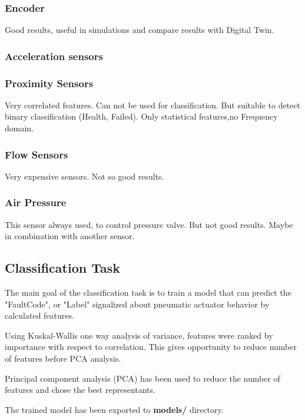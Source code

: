 \documentclass[class=article, crop=false]{standalone}
\begin{document}
\subsubsection{Encoder}
Good results, useful in simulations and compare results with Digital Twin.

\subsubsection{Acceleration sensors}

\subsubsection{Proximity Sensors}
Very correlated features. Can not be used for classification. But suitable
to detect binary classification (Health, Failed).
Only statistical features,no Frequency domain.

\subsubsection{Flow Sensors}
Very expensive sensors. Not so good results.

\subsubsection{Air Pressure}
This sensor always used, to control pressure valve. But not good results.
Maybe in combination with another sensor.

\subsection{Classification Task}

The main goal of the classification task is to train a model that can
predict the "FaultCode", or "Label" signalized about pneumatic actuator behavior by
calculated features.

Using Kuskal-Wallis one way analysis of variance, features were ranked by
importance with respect to correlation. This gives opportunity to reduce
number of features before PCA analysis.

Principal component analysis (PCA) has been used to reduce the number of
features and chose the best representants.

The trained model has been exported to
\textbf{models/} directory.
\end{document}
